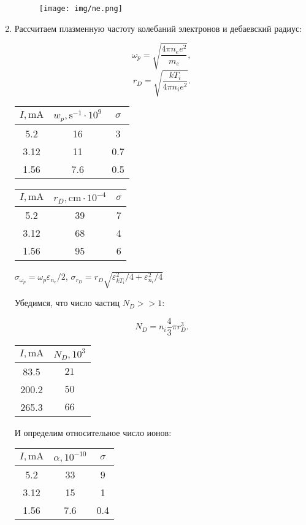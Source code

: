 \documentclass[12pt]{article}
\begin{document}
\begin{enumerate}
	\begin{figure}[htb]
	    \centering
	    \texttt{[image: img/ne.png]}
	\end{figure}
	
	\newpage
	\item Рассчитаем плазменную частоту колебаний электронов и дебаевский радиус:
	
	\begin{equation}
	    \omega_p = \sqrt{\dfrac{4 \pi n_e e^2}{m_e}},
	\end{equation}
	\begin{equation}
	    r_D = \sqrt{\dfrac{k T_i}{4 \pi n_i e^2}}.
	\end{equation}
	
	\begin{tabular}{|c|c|c|}
	\hline
	     $I, \si{\milli\ampere}$ & $w_p, \si{\second}^{-1} \cdot 10^9$ & $\sigma$ \\ \hline
	     5.2 & 16 & 3 \\ \hline
	     3.12 & 11 & 0.7 \\ \hline
	     1.56 & 7.6 & 0.5 \\ \hline
	\end{tabular}
	\begin{tabular}{|c|c|c|}
	\hline
	     $I, \si{\milli\ampere}$ & $r_D, \si{\centi \metre} \cdot 10^{-4}$ & $\sigma$ \\ \hline
	     5.2 & 39 & 7 \\ \hline
	     3.12 & 68 & 4 \\ \hline
	     1.56 & 95 & 6 \\ \hline
	\end{tabular}
	$\sigma_{\omega_p} = \omega_p \varepsilon_{n_e} / 2$, $\sigma_{r_D} = r_D \sqrt{\varepsilon_{kT_i}^2 / 4 + \varepsilon_{n_i}^2 / 4}$
	
	Убедимся, что число частиц $N_D >> 1$:
	
	\begin{equation}
	    N_D = n_i \dfrac{4}{3} \pi r_D^3.
	\end{equation}
	
	\begin{tabular}{|c|c|}
	\hline
	     $I, \si{\milli\ampere}$ & $N_D, 10^3$ \\ \hline
	     83.5 & $21 $ \\ \hline
	     200.2 & $50 $ \\ \hline
	     265.3 & $66 $ \\ \hline
	\end{tabular}
	
	И определим относительное число ионов:
	
	\begin{tabular}{|c|c|c|}
	\hline
	     $I, \si{\milli\ampere}$ & $\alpha, 10^{-10}$ & $\sigma$ \\ \hline
	     5.2 & 33 & 9 \\ \hline
	     3.12 & 15 & 1 \\ \hline
	     1.56 & 7.6 & 0.4 \\ \hline
	\end{tabular}

\end{enumerate}
\end{document}
